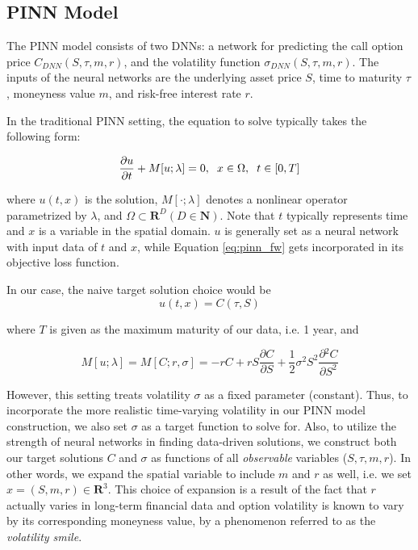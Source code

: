 \documentclass{article}
\begin{document}
\subsection{PINN Model}
The PINN model consists of two DNNs:
a network for predicting the call option price $C_{DNN}(S, \tau, m, r)$,  and the volatility function $\sigma_{DNN}(S, \tau, m, r)$.
The inputs of the neural networks are the underlying asset price $S$, time to maturity $\tau$, moneyness value $m$, and risk-free interest rate $r$.


In the traditional PINN setting, the equation to solve typically takes the following form:

\begin{equation}
    \frac{\partial{u}}{\partial{t}} + M[u; \lambda] = 0, \hspace{0.2cm} x \in \Omega, \hspace{0.2cm} t \in [0, T] \label{eq:pinn_fw}
\end{equation}

where $u(t, x)$ is the solution, $M[\cdot; \lambda]$ denotes a nonlinear operator parametrized by $\lambda$, and $\Omega \subset \textbf{R}^{D} (D \in \textbf{N})$. Note that $t$ typically represents time and $x$ is a variable in the spatial domain. $u$ is generally set as a neural network with input data of $t$ and $x$, while Equation \eqref{eq:pinn_fw} gets incorporated in its objective loss function.

In our case, the naive target solution choice would be
\begin{equation}
    u(t, x) = C(\tau, S)
\end{equation}

where $T$ is given as the maximum maturity of our data, i.e. 1 year, and
 
 \begin{equation}
     M[u; \lambda] = M[C; r, \sigma] = - rC + rS\frac{\partial{C}}{\partial{S}} + \frac{1}{2}\sigma^{2}S^{2}\frac{\partial{^2C}}{\partial{S^2}}
 \end{equation}
 
However, this setting treats volatility $\sigma$ as a fixed parameter (constant). Thus, to incorporate the more realistic time-varying volatility in our PINN model construction, we also set $\sigma$ as a target function to solve for. Also, to utilize the strength of neural networks in finding data-driven solutions, we construct both our target solutions $C$ and $\sigma$ as functions of all \textit{observable} variables ($S, \tau, m, r$). In other words, we expand the spatial variable to include $m$ and $r$ as well, i.e. we set $x = (S, m, r) \in \textbf{R}^{3}$. This choice of expansion is a result of the fact that $r$ actually varies in long-term financial data and option volatility is known to vary by its corresponding moneyness value, by a phenomenon referred to as the \textit{volatility smile}.
\end{document}
